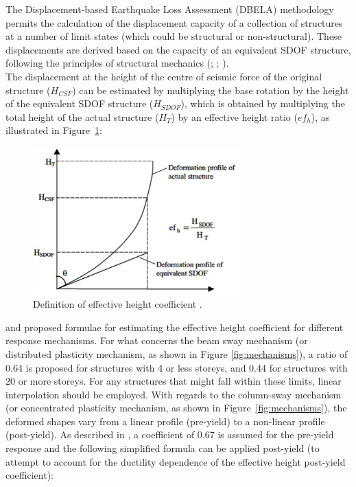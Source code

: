 The Displacement-based Earthquake Loss Assessment (DBELA) methodology permits the calculation of the displacement capacity of a collection of structures at a number of limit states (which could be structural or non-structural). These displacements are derived based on the capacity of an equivalent SDOF structure, following the principles of structural mechanics (\cite{CrowleyEtAl2004}; \cite{BalEtAl2010}; \cite{SilvaEtAl2013}).\\
The displacement at the height of the centre of seismic force of the original structure ($H_{CSF}$) can be estimated by multiplying the base rotation by the height of the equivalent SDOF structure ($H_{SDOF}$), which is obtained by multiplying the total height of the actual structure ($H_T$) by an effective height ratio ($ef_h$), as illustrated in Figure~\ref{fig:efh}:

\begin{figure}[htb]
  \centering
      \includegraphics[width=8cm]{Figures/effective_height.png}
  \caption{Definition of effective height coefficient \cite{GlaisterPinho2003}.}
  \label{fig:efh}
\end{figure}

\cite{PinhoEtAl2002} and \cite{GlaisterPinho2003} proposed formulae for estimating the effective height coefficient for different response mechanisms. For what concerns the beam sway mechanism (or distributed plasticity mechanism, as shown in Figure \ref{fig:mechanisms}), a ratio of 0.64 is proposed for structures with 4 or less storeys, and 0.44 for structures with 20 or more storeys. For any structures that might fall within these limits, linear interpolation should be employed. With regards to the column-sway mechanism (or concentrated plasticity mechanism, as shown in Figure~\ref{fig:mechanisms}), the deformed shapes vary from a linear profile (pre-yield) to a non-linear profile (post-yield). As described in \cite{GlaisterPinho2003}, a coefficient of 0.67 is assumed for the pre-yield response and the following simplified formula can be applied post-yield (to attempt to account for the ductility dependence of the effective height post-yield coefficient):

